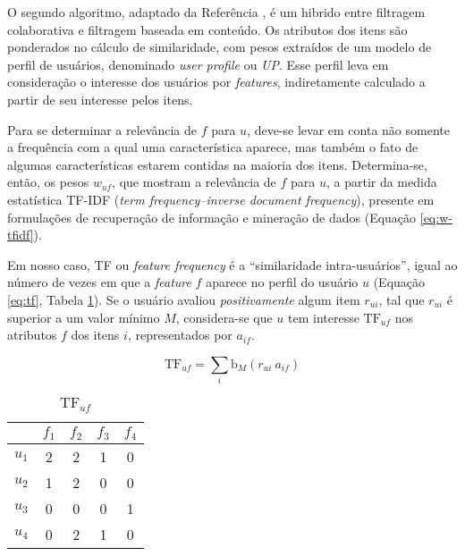 
O segundo algoritmo, adaptado da Referência , é um hibrido entre filtragem colaborativa e filtragem baseada em conteúdo. Os atributos dos itens são ponderados no cálculo de similaridade, com pesos extraídos de um modelo de perfil de usuários, denominado \textit{user profile} ou \textit{UP}. Esse perfil leva em consideração o interesse dos usuários por \textit{features}, indiretamente calculado a partir de seu interesse pelos itens. 

Para se determinar a relevância de $f$ para $u$, deve-se levar em conta não somente a frequência com a qual uma característica aparece, mas também o fato de algumas características estarem contidas na maioria dos itens. Determina-se, então, os pesos $w_{uf}$, que mostram a relevância de $f$ para $u$, a partir da medida estatística TF-IDF (\textit{term frequency--inverse document frequency}), presente em formulações de recuperação de informação e mineração de dados (Equação \ref{eq:w-tfidf}). 

Em nosso caso, TF ou \textit{feature frequency} é a ``similaridade intra-usuários'', igual ao número de vezes em que a \textit{feature} $f$ aparece no perfil do usuário $u$ (Equação \ref{eq:tf}, Tabela \ref{tab:tf_uf}). Se o usuário avaliou \textit{positivamente} algum item $r_{ui}$, tal que $r_{ui}$ é superior a um valor mínimo $M$, considera-se que $u$ tem interesse $\mathrm{TF}_{uf}$ nos atributos $f$ dos itens $i$, representados por $a_{if}$. 

\begin{equation}
\label{eq:tf} 
    \mathrm{TF}_{uf}  = \sum_{i}{\mathrm{b}_M\left(r_{ui}~a_{if}\right)} 
\end{equation} 

\begin{table}[p]
\begin{center}
    \caption{$\mathrm{TF}_{uf}$}
    \label{tab:tf_uf}
    \begin{tabular}{ | c | c | c | c | c | } 
    \hline
     & $f_1$ & $f_2$ & $f_3$ & $f_4$   \\ \hline
     $u_1$ & 2 & 2 & 1 & 0  \\ \hline
     $u_2$ & 1 & 2 & 0 & 0  \\ \hline
     $u_3$ & 0 & 0 & 0 & 1  \\ \hline
     $u_4$ & 0 & 2 & 1 & 0  \\ \hline
    \end{tabular}
\end{center}
\end{table}

